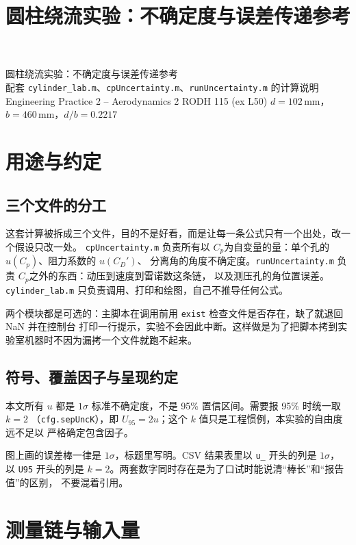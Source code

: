 \documentclass[11pt,a4paper]{ctexart}
\title{\heiti 圆柱绕流实验：不确定度与误差传递参考}
\author{}
\date{}
\newcommand{\Cp}{\ensuremath{C_p}}
\newcommand{\CD}{\ensuremath{C_D}}
\begin{document}
\begin{center}
{\LARGE\heiti 圆柱绕流实验：不确定度与误差传递参考}\\[6pt]
{\large 配套 \texttt{cylinder\_lab.m}、\texttt{cpUncertainty.m}、\texttt{runUncertainty.m} 的计算说明}\\[10pt]
{\small Engineering Practice 2 -- Aerodynamics 2 \quad\textbar\quad RODH 115 (ex L50) \quad\textbar\quad
$d = 102$\,mm，$b = 460$\,mm，$d/b = 0.2217$}
\end{center}

\vspace{6pt}

\section{用途与约定}

\subsection{三个文件的分工}

这套计算被拆成三个文件，目的不是好看，而是让每一条公式只有一个出处，改一个假设只改一处。
\texttt{cpUncertainty.m} 负责所有以 \Cp 为自变量的量：单个孔的 $u(\Cp)$、阻力系数的 $u(\CD')$、
分离角的角度不确定度。\texttt{runUncertainty.m} 负责 \Cp 之外的东西：动压到速度到雷诺数这条链，
以及测压孔的角位置误差。\texttt{cylinder\_lab.m} 只负责调用、打印和绘图，自己不推导任何公式。

两个模块都是可选的：主脚本在调用前用 \texttt{exist} 检查文件是否存在，缺了就退回 NaN 并在控制台
打印一行提示，实验不会因此中断。这样做是为了把脚本拷到实验室机器时不因为漏拷一个文件就跑不起来。

\subsection{符号、覆盖因子与呈现约定}

本文所有 $u$ 都是 $1\sigma$ 标准不确定度，不是 95\% 置信区间。需要报 95\% 时统一取 $k = 2$
（\texttt{cfg.sepUncK}），即 $U_{95} = 2u$；这个 $k$ 值只是工程惯例，本实验的自由度远不足以
严格确定包含因子。

图上画的误差棒一律是 $1\sigma$，标题里写明。CSV 结果表里以 \texttt{u\_} 开头的列是 $1\sigma$，
以 \texttt{U95} 开头的列是 $k=2$。两套数字同时存在是为了口试时能说清“棒长”和“报告值”的区别，
不要混着引用。

\section{测量链与输入量}
\end{document}
